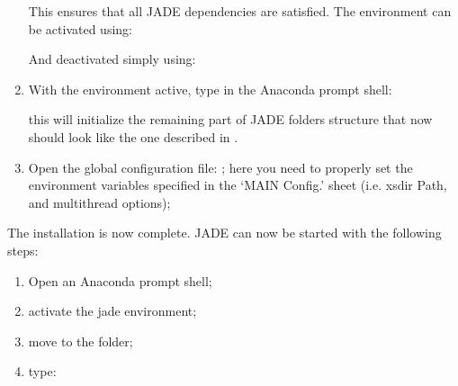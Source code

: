 \documentclass[letterpaper,10pt,english]{sphinxmanual}
\begin{document}
\begin{enumerate}
\sphinxAtStartPar
This ensures that all JADE dependencies are satisfied. The environment can be activated using:

\sphinxAtStartPar
{}

\sphinxAtStartPar
And deactivated simply using:

\sphinxAtStartPar
{}

\item {} 
\sphinxAtStartPar
With the environment active, type in the Anaconda prompt shell:

\sphinxAtStartPar
{}

\sphinxAtStartPar
this will initialize the remaining part of JADE folders structure that now
should look like the one described in {\hyperref[\detokenize{usage/folders:folders}]{}}.

\item {} 
\sphinxAtStartPar
Open the global configuration file: ;
here you need to properly set the environment variables specified in the
‘MAIN Config.’ sheet (i.e. xsdir Path, and multithread options);

\end{enumerate}

\sphinxAtStartPar
The installation is now complete. JADE can now be started with the following
steps:
\begin{enumerate}
%
\item {} 
\sphinxAtStartPar
Open an Anaconda prompt shell;

\item {} 
\sphinxAtStartPar
activate the jade environment;

\item {} 
\sphinxAtStartPar
move to the  folder;

\item {} 
\sphinxAtStartPar
type:

\sphinxAtStartPar
{}

\end{enumerate}


\nopagebreak
\end{document}
